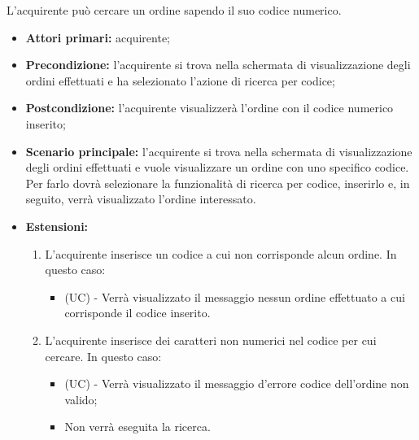
L'acquirente può cercare un ordine sapendo il suo codice numerico.
\begin{itemize}
    \item \textbf{Attori primari:} acquirente;
    \item \textbf{Precondizione:} l'acquirente si trova nella schermata di visualizzazione degli ordini effettuati e ha selezionato l'azione di ricerca per codice;
    \item \textbf{Postcondizione:} l'acquirente visualizzerà l'ordine con il codice numerico inserito;
    \item \textbf{Scenario principale:} l'acquirente si trova nella schermata di visualizzazione degli ordini effettuati e vuole visualizzare un ordine con uno specifico codice. Per farlo dovrà selezionare la funzionalità di ricerca per codice, inserirlo e, in seguito, verrà visualizzato l'ordine interessato.
    \item \textbf{Estensioni:}
    \begin{enumerate}[label=\lett]
        \item L'acquirente inserisce un codice a cui non corrisponde alcun ordine. In questo caso:
        \begin{itemize}
            \item (UC) - Verrà visualizzato il messaggio nessun ordine effettuato a cui corrisponde il codice inserito.
        \end{itemize}
        \item L'acquirente inserisce dei caratteri non numerici nel codice per cui cercare. In questo caso:
        \begin{itemize}
            \item (UC) - Verrà visualizzato il messaggio d'errore codice dell'ordine non valido;
            \item Non verrà eseguita la ricerca.
        \end{itemize}
    \end{enumerate}
\end{itemize}


